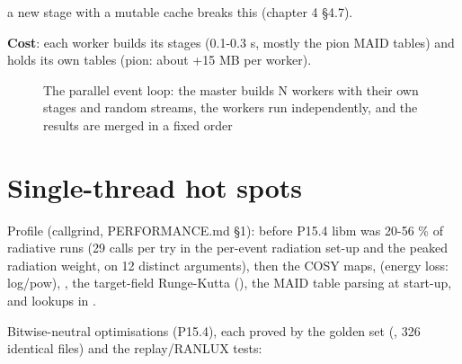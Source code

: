 \begin{simcwarning}
a new stage with a  mutable cache breaks this (chapter 4 §4.7).
\end{simcwarning}
\textbf{Cost}: each worker builds its stages (0.1-0.3 s, mostly the pion MAID tables) and holds its own tables (pion: about
+15 MB per worker).

\begin{figure}[htbp]
\caption[The parallel event loop]{The parallel event loop: the master builds N workers with their own stages and random streams, the workers run independently,\allowbreak{} and the results are merged in a fixed order}\label{fig:parallelu5fmode}
\end{figure}
\section{\texorpdfstring{Single-thread hot spots}{Single-thread hot spots}}\label{developer_manual-05u5fparallel:52-single-thread-hot-spots}
Profile (callgrind, PERFORMANCE.md §1): before P15.4 libm  was 20-56 \% of radiative runs (29 calls per try in the per-event radiation set-up and the peaked radiation weight, on 12 distinct arguments), then the COSY 
maps,  (energy loss: log/pow), , the target-field Runge-Kutta (), the
MAID table parsing at start-up, and  lookups in .

Bitwise-neutral optimisations (P15.4), each proved by the golden set (, 326 identical files) and the
replay/\allowbreak{}RANLUX tests:

